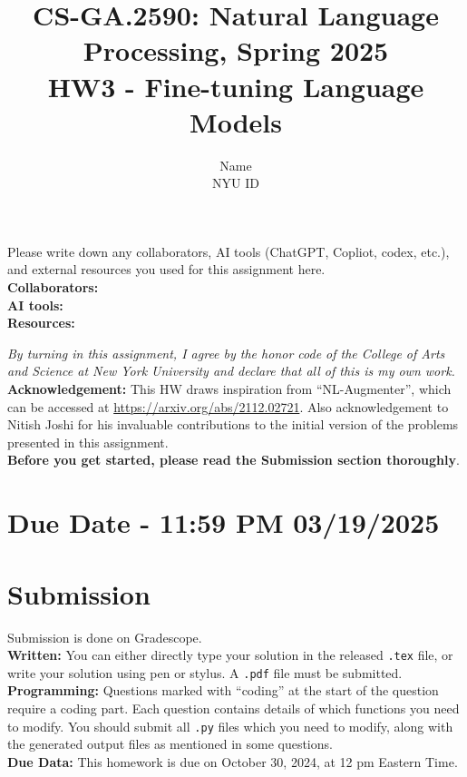 \documentclass{article}
\title{\textbf{CS-GA.2590: Natural Language Processing, Spring 2025} \\HW3 - Fine-tuning Language Models}
\author{Name \\
NYU ID}
\date{}
\theoremstyle{case}
\theoremstyle{definition}
\begin{document}
\maketitle

\begin{tcolorbox}
Please write down any collaborators, AI tools (ChatGPT, Copliot, codex, etc.), and external resources you used for this assignment here. \\
\textbf{Collaborators:} \\
\textbf{AI tools:} \\
\textbf{Resources:}
\end{tcolorbox}
\textit{By turning in this assignment, I agree by the honor code of the College of Arts and Science at New York University and declare
that all of this is my own work.} \\

\textbf{Acknowledgement:} This HW draws inspiration from ``NL-Augmenter'', which can be accessed at \url{https://arxiv.org/abs/2112.02721}. Also acknowledgement to Nitish Joshi for his invaluable contributions to the initial version of the problems presented in this assignment. \\


\textbf{Before you get started, please read the Submission section thoroughly}.

\section*{Due Date - 11:59 PM 03/19/2025}

\section*{Submission}
Submission is done on Gradescope. \\

\textbf{Written:} You can either directly type your solution in the released \texttt{.tex} file,
or write your solution using pen or stylus.
A \texttt{.pdf} file must be submitted.\\

\textbf{Programming:} Questions marked with ``coding'' at the start of the question require a coding part. Each question contains details of which functions you need to modify. You should submit all \texttt{.py} files which you need to modify, along with the generated output files as mentioned in some questions. \\

\textbf{Due Data:} This homework is due on October 30, 2024, at 12 pm Eastern Time.
\end{document}
